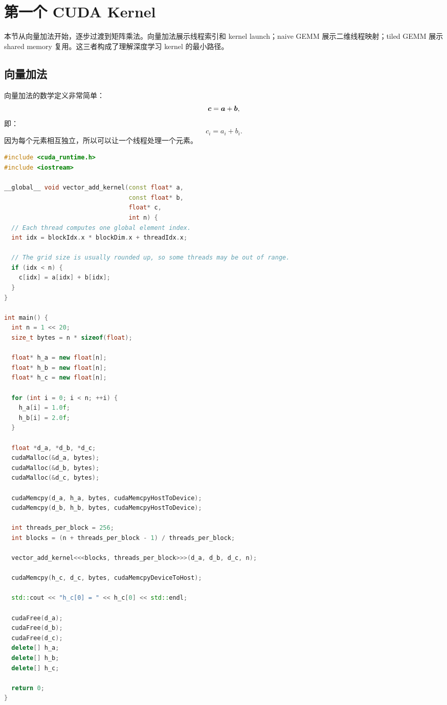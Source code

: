 \section{第一个 CUDA Kernel}
\label{sec:first-cuda-kernel}

本节从向量加法开始，逐步过渡到矩阵乘法。向量加法展示线程索引和 kernel launch；naive GEMM 展示二维线程映射；tiled GEMM 展示 shared memory 复用。这三者构成了理解深度学习 kernel 的最小路径。

\subsection{向量加法}
\label{subsec:cuda-vector-add}

向量加法的数学定义非常简单：
\[
  \bm{c}=\bm{a}+\bm{b},
\]
即：
\[
  c_i=a_i+b_i.
\]
因为每个元素相互独立，所以可以让一个线程处理一个元素。

\begin{lstlisting}[language=C++,caption={CUDA 向量加法 Kernel},label={lst:cuda-vector-add-kernel}]
#include <cuda_runtime.h>
#include <iostream>

__global__ void vector_add_kernel(const float* a,
                                  const float* b,
                                  float* c,
                                  int n) {
  // Each thread computes one global element index.
  int idx = blockIdx.x * blockDim.x + threadIdx.x;

  // The grid size is usually rounded up, so some threads may be out of range.
  if (idx < n) {
    c[idx] = a[idx] + b[idx];
  }
}

int main() {
  int n = 1 << 20;
  size_t bytes = n * sizeof(float);

  float* h_a = new float[n];
  float* h_b = new float[n];
  float* h_c = new float[n];

  for (int i = 0; i < n; ++i) {
    h_a[i] = 1.0f;
    h_b[i] = 2.0f;
  }

  float *d_a, *d_b, *d_c;
  cudaMalloc(&d_a, bytes);
  cudaMalloc(&d_b, bytes);
  cudaMalloc(&d_c, bytes);

  cudaMemcpy(d_a, h_a, bytes, cudaMemcpyHostToDevice);
  cudaMemcpy(d_b, h_b, bytes, cudaMemcpyHostToDevice);

  int threads_per_block = 256;
  int blocks = (n + threads_per_block - 1) / threads_per_block;

  vector_add_kernel<<<blocks, threads_per_block>>>(d_a, d_b, d_c, n);

  cudaMemcpy(h_c, d_c, bytes, cudaMemcpyDeviceToHost);

  std::cout << "h_c[0] = " << h_c[0] << std::endl;

  cudaFree(d_a);
  cudaFree(d_b);
  cudaFree(d_c);
  delete[] h_a;
  delete[] h_b;
  delete[] h_c;

  return 0;
}
\end{lstlisting}


